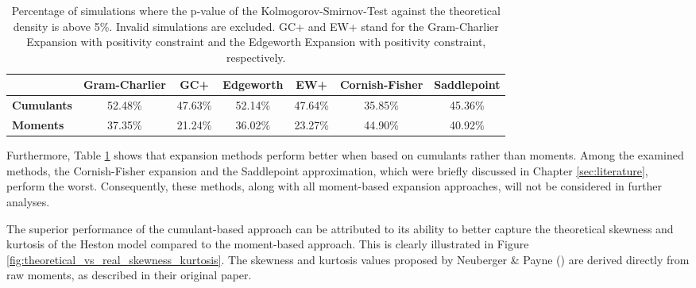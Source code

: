 \begin{table}[h]
    \centering
    \begin{tabular}{l|c|c|c|c|c|c}
        & \textbf{Gram-Charlier} & \textbf{GC+} & \textbf{Edgeworth} & \textbf{EW+} & \textbf{Cornish-Fisher} & \textbf{Saddlepoint} \\
        \hline
        \textbf{Cumulants} & 52.48\% & 47.63\% & 52.14\% & 47.64\% & 35.85\% & 45.36\% \\
        \textbf{Moments} & 37.35\% & 21.24\% & 36.02\% & 23.27\% & 44.90\% & 40.92\%
    \end{tabular}
    \caption{Percentage of simulations where the p-value of the Kolmogorov-Smirnov-Test against the theoretical density is above 5\%. Invalid simulations are excluded. GC+ and EW+ stand for the Gram-Charlier Expansion with positivity constraint and the Edgeworth Expansion with positivity constraint, respectively.}
    \label{tab:KS_p_value_percentage}
\end{table}

Furthermore, Table \ref{tab:KS_p_value_percentage} shows that expansion methods perform better when based on cumulants rather than moments. Among the examined methods, the Cornish-Fisher expansion and the Saddlepoint approximation, which were briefly discussed in Chapter \ref{sec:literature}, perform the worst. Consequently, these methods, along with all moment-based expansion approaches, will not be considered in further analyses.

The superior performance of the cumulant-based approach can be attributed to its ability to better capture the theoretical skewness and kurtosis of the Heston model compared to the moment-based approach. This is clearly illustrated in Figure \ref{fig:theoretical_vs_real_skewness_kurtosis}. The skewness and kurtosis values proposed by Neuberger \& Payne (\citeyear{neubergerSkewnessStockMarket2021}) are derived directly from raw moments, as described in their original paper.


